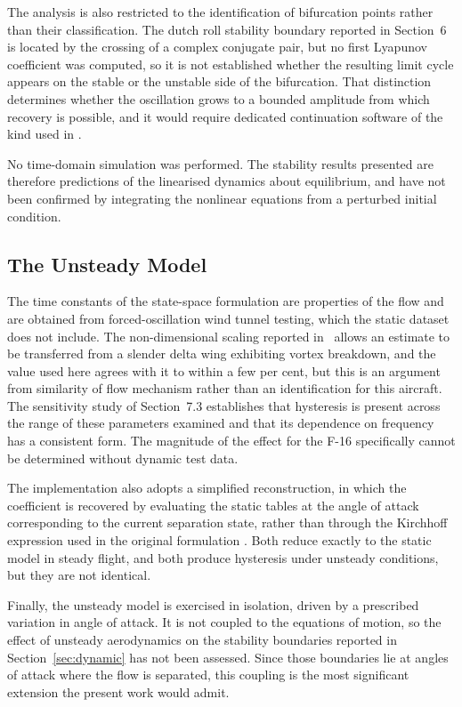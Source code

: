 \documentclass[
bindingoffset=5mm,  %
footnoteindent=3mm, %
hyphenation=true    %
]{src/wut-thesis}
\begin{document}
 The analysis is also restricted to the identification of bifurcation points
 rather than their classification. 
 The dutch roll stability boundary reported in Section~6 is located by the
 crossing of a complex conjugate pair, but no first Lyapunov coefficient was computed, so it is not
 established whether the resulting limit cycle appears on the stable or the
 unstable side of the bifurcation. That distinction determines whether the
 oscillation grows to a bounded amplitude from which recovery is possible, and
 it would require dedicated continuation software of the kind used in
 \cite{kolb2017}.
 
 No time-domain simulation was performed. The stability results presented are
 therefore predictions of the linearised dynamics about equilibrium, and have
 not been confirmed by integrating the nonlinear equations from a perturbed
 initial condition.
 
 \subsection{The Unsteady Model}
 
 
 The time constants of the state-space formulation are properties of the flow
 and are obtained from forced-oscillation wind tunnel testing, which the static
 dataset does not include. The non-dimensional scaling reported
 in~\cite{goman1994} allows an estimate to be transferred from a slender delta
 wing exhibiting vortex breakdown, and the value used here agrees with it to
 within a few per cent, but this is an argument from similarity of flow
 mechanism rather than an identification for this aircraft. The sensitivity
 study of Section~7.3 establishes that hysteresis is present across the range
 of these parameters examined and that its dependence on frequency has a
 consistent form. The magnitude of the effect for the F-16 specifically cannot
 be determined without dynamic test data.
 
 
 The implementation also adopts a simplified reconstruction, in which the
 coefficient is recovered by evaluating the static tables at the angle of
 attack corresponding to the current separation state, rather than through the
 Kirchhoff expression used in the original formulation \cite{goman1994}. Both
 reduce exactly to the static model in steady flight, and both produce
 hysteresis under unsteady conditions, but they are not identical.
 
 Finally, the unsteady model is exercised in isolation, driven by a prescribed
 variation in angle of attack. It is not coupled to the equations of motion, so
 the effect of unsteady aerodynamics on the stability boundaries reported in
 Section~\ref{sec:dynamic} has not been assessed. Since those boundaries lie at
 angles of attack where the flow is separated, this coupling is the most
 significant extension the present work would admit.
 
\end{document}
